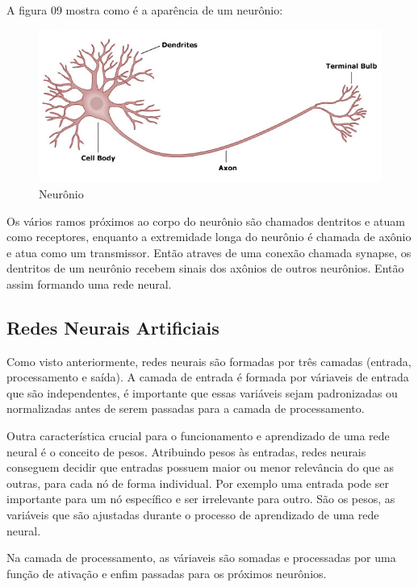 A figura 09 mostra como é a aparência de um neurônio:

\begin{figure}[h]
	\centering
	\includegraphics[keepaspectratio=true,scale=0.5]{figuras/n.png}
	\caption{Neurônio \cite{penn}}
	\label{fig09}
\end{figure}

Os vários ramos próximos ao corpo do neurônio são chamados dentritos e atuam como receptores, enquanto a extremidade longa do neurônio
é chamada de axônio e atua como um transmissor. Então atraves de uma conexão chamada synapse, os dentritos de um neurônio recebem sinais
dos axônios de outros neurônios. Então assim formando uma rede neural. \cite{kandel}

\subsection{Redes Neurais Artificiais}

Como visto anteriormente, redes neurais são formadas por três camadas (entrada, processamento e saída). A camada de entrada é formada
por váriaveis de entrada que são independentes, é importante que essas variáveis sejam padronizadas ou normalizadas antes de serem passadas
para a camada de processamento.\cite{levine}

Outra característica crucial para o funcionamento e aprendizado de uma rede neural é o conceito de pesos. Atribuindo pesos às entradas,
redes neurais conseguem decidir que entradas possuem maior ou menor relevância do que as outras, para cada nó de forma individual. Por exemplo
uma entrada pode ser importante para um nó específico e ser irrelevante para outro. São os pesos, as variáveis que são ajustadas durante
o processo de aprendizado de uma rede neural. \cite{yann}

Na camada de processamento, as váriaveis são somadas e processadas por uma função de ativação e enfim passadas para os próximos neurônios.

